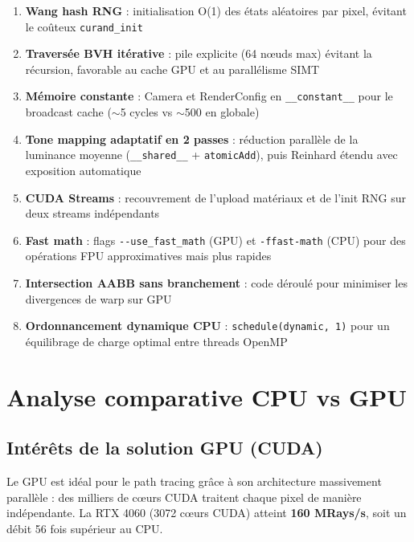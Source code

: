 \documentclass[12pt,a4paper]{article}
\begin{document}
\begin{enumerate}
    \item \textbf{Wang hash RNG} : initialisation O(1) des états aléatoires par pixel,
    évitant le coûteux \texttt{curand\_init}

    \item \textbf{Traversée BVH itérative} : pile explicite (64 nœuds max) évitant
    la récursion, favorable au cache GPU et au parallélisme SIMT

    \item \textbf{Mémoire constante} : Camera et RenderConfig en \texttt{\_\_constant\_\_}
    pour le broadcast cache ($\sim$5 cycles vs $\sim$500 en globale)

    \item \textbf{Tone mapping adaptatif en 2 passes} : réduction parallèle de la
    luminance moyenne (\texttt{\_\_shared\_\_} + \texttt{atomicAdd}), puis
    Reinhard étendu avec exposition automatique

    \item \textbf{CUDA Streams} : recouvrement de l'upload matériaux et de l'init
    RNG sur deux streams indépendants

    \item \textbf{Fast math} : flags \texttt{-{}-use\_fast\_math} (GPU) et \texttt{-ffast-math}
    (CPU) pour des opérations FPU approximatives mais plus rapides

    \item \textbf{Intersection AABB sans branchement} : code déroulé pour minimiser
    les divergences de warp sur GPU

    \item \textbf{Ordonnancement dynamique CPU} : \texttt{schedule(dynamic, 1)} pour
    un équilibrage de charge optimal entre threads OpenMP
\end{enumerate}

\section{Analyse comparative CPU vs GPU}

\subsection{Intérêts de la solution GPU (CUDA)}

Le GPU est idéal pour le path tracing grâce à son architecture massivement parallèle :
des milliers de cœurs CUDA traitent chaque pixel de manière indépendante.
La RTX 4060 (3072 cœurs CUDA) atteint \textbf{160 MRays/s}, soit un débit
56 fois supérieur au CPU.
\end{document}
